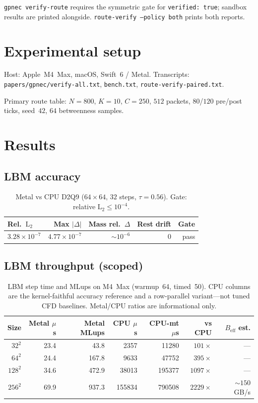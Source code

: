 \documentclass[11pt,a4paper]{article}
\begin{document}
\texttt{gpnec verify-route} requires the symmetric gate for
\texttt{verified: true}; sandbox results are printed alongside.
\texttt{route-verify --policy both} prints both reports.

\section{Experimental setup}
\label{sec:setup}

Host: Apple~M4~Max, macOS, Swift~6 / Metal. Transcripts:
\texttt{papers/gpnec/verify-all.txt}, \texttt{bench.txt},
\texttt{route-verify-paired.txt}.

Primary route table: $N=800$, $K=10$, $C=250$, $512$ packets, $80$/$120$
pre/post ticks, seed~$42$, $64$ betweenness samples.

\section{Results}
\label{sec:results}

\subsection{LBM accuracy}

\begin{table}[ht]
\centering
\caption{Metal vs CPU D2Q9 ($64\times64$, $32$ steps, $\tau=0.56$). Gate:
relative $\mathrm{L}_2\le10^{-4}$.}
\label{tab:lbm-acc}
\begin{tabular}{@{}lrrrr@{}}
\toprule
Rel.\ $\mathrm{L}_2$ & Max $|\!\Delta\!|$ & Mass rel.\ $\Delta$ & Rest drift & Gate \\
\midrule
$3.28\times10^{-7}$ & $4.77\times10^{-7}$ & $\sim10^{-6}$ & $0$ & pass \\
\bottomrule
\end{tabular}
\end{table}

\subsection{LBM throughput (scoped)}

\begin{table}[ht]
\centering
\caption{LBM step time and MLups on M4~Max (warmup~64, timed~50).
CPU columns are the kernel-faithful accuracy reference and a row-parallel
variant---not tuned CFD baselines. Metal/CPU ratios are informational only.}
\label{tab:lbm-thru}
\begin{tabular}{@{}rrrrrrr@{}}
\toprule
Size & Metal $\mu$s & Metal MLups & CPU $\mu$s & CPU-mt $\mu$s & vs CPU & $B_{\mathrm{eff}}$ est. \\
\midrule
$32^2$  & 23.4 & 43.8  & 2357  & 11280  & $101\times$ & --- \\
$64^2$  & 24.4 & 167.8 & 9633  & 47752  & $395\times$ & --- \\
$128^2$ & 34.6 & 472.9 & 38013 & 195377 & $1097\times$ & --- \\
$256^2$ & 69.9 & 937.3 & 155834& 790508 & $2229\times$ & $\sim150$~GB/s \\
\bottomrule
\end{tabular}
\end{table}
\end{document}
